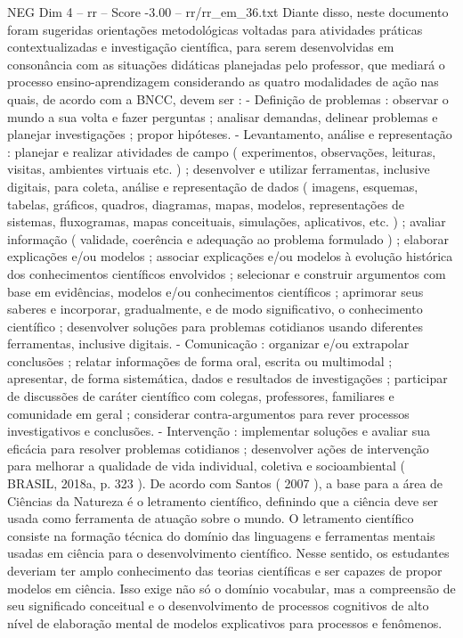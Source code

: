 \begin{textsample}{NEG Dim 4 – rr – Score -3.00 – rr/rr\_em\_36.txt}
Diante disso, neste documento foram sugeridas orientações metodológicas voltadas para atividades práticas contextualizadas e investigação científica, para serem desenvolvidas em consonância com as situações didáticas planejadas pelo professor, que mediará o processo ensino-aprendizagem considerando as quatro modalidades de ação nas quais, de acordo com a BNCC, devem ser : - Definição de problemas : observar o mundo a sua volta e fazer perguntas ; analisar demandas, delinear problemas e planejar investigações ; propor hipóteses. - Levantamento, análise e representação : planejar e realizar atividades de campo ( experimentos, observações, leituras, visitas, ambientes virtuais etc. ) ; desenvolver e utilizar ferramentas, inclusive digitais, para coleta, análise e representação de dados ( imagens, esquemas, tabelas, gráficos, quadros, diagramas, mapas, modelos, representações de sistemas, fluxogramas, mapas conceituais, simulações, aplicativos, etc. ) ; avaliar informação ( validade, coerência e adequação ao problema formulado ) ; elaborar explicações e/ou modelos ; associar explicações e/ou modelos à evolução histórica dos conhecimentos científicos envolvidos ; selecionar e construir argumentos com base em evidências, modelos e/ou conhecimentos científicos ; aprimorar seus saberes e incorporar, gradualmente, e de modo significativo, o conhecimento científico ; desenvolver soluções para problemas cotidianos usando diferentes ferramentas, inclusive digitais. - Comunicação : organizar e/ou extrapolar conclusões ; relatar informações de forma oral, escrita ou multimodal ; apresentar, de forma sistemática, dados e resultados de investigações ; participar de discussões de caráter científico com colegas, professores, familiares e comunidade em geral ; considerar contra-argumentos para rever processos investigativos e conclusões. - Intervenção : implementar soluções e avaliar sua eficácia para resolver problemas cotidianos ; desenvolver ações de intervenção para melhorar a qualidade de vida individual, coletiva e socioambiental ( BRASIL, 2018a, p. 323 ).
De acordo com Santos ( 2007 ), a base para a área de Ciências da Natureza é o letramento científico, definindo que a ciência deve ser usada como ferramenta de atuação sobre o mundo.
O letramento científico consiste na formação técnica do domínio das linguagens e ferramentas mentais usadas em ciência para o desenvolvimento científico.
Nesse sentido, os estudantes deveriam ter amplo conhecimento das teorias científicas e ser capazes de propor modelos em ciência.
Isso exige não só o domínio vocabular, mas a compreensão de seu significado conceitual e o desenvolvimento de processos cognitivos de alto nível de elaboração mental de modelos explicativos para processos e fenômenos.

\end{textsample}
